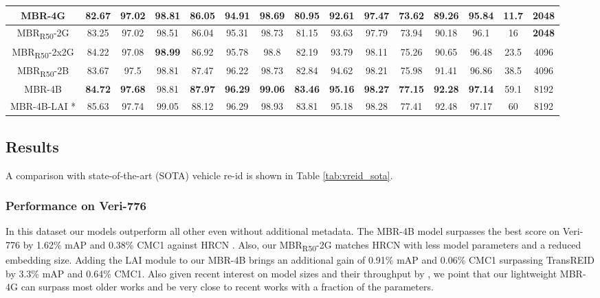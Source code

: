 \documentclass[letterpaper, 10pt, conference]{ieeeconf}
\begin{document}
\begin{table*}[tb]
\begin{center}
{\begin{tabular}{c||c|c|c||c|c|c|c|c|c|c|c|c||c|c}
MBR-4G & 82.67 & 97.02 & 98.81 & 86.05 & 94.91 & 98.69 &  80.95 & 92.61 & 97.47 & 73.62 & 89.26 & 95.84 & \textbf{11.7} & \textbf{2048} \\ \hline 
MBR\textsubscript{R50}-2G & 83.25 & 97.02 & 98.51 & 86.04 & 95.31 & 98.73 & 81.15 & 93.63 & 97.79 & 73.94 & 90.18 & 96.1 & 16 & \textbf{2048} \\ \hline 


 MBR\textsubscript{R50}-2x2G & 84.22 & 97.08 & \textbf{98.99} & 86.92 & 95.78 & 98.8 & 82.19 & 93.79 & 98.11 & 75.26 & 90.65 & 96.48 & 23.5 & 4096 \\ \hline
 MBR\textsubscript{R50}-2B  & 83.67 & 97.5 & 98.81 & 87.47 & 96.22 & 98.73 & 82.84 & 94.62 & 98.21 & 75.98 & 91.41 & 96.86 & 38.5 & 4096 \\ \hline 
MBR-4B & \textbf{84.72} & \textbf{97.68} & 98.81 & \textbf{87.97} & \textbf{96.29} & \textbf{99.06} & \textbf{83.46} & \textbf{95.16} & \textbf{98.27} & \textbf{77.15} & \textbf{92.28} & \textbf{97.14} & 59.1 & 8192 \\ \hline \hline

MBR-4B-LAI * & 85.63 & 97.74 & 99.05 & 88.12 & 96.29 & 98.93 & 83.81 & 95.18 & 98.28 & 77.41 & 92.48 & 97.17 & 60 & 8192 \\ \hline 


\end{tabular}}
\label{tab:vreid_sota}
\end{center}
\end{table*}




\subsection{Results}
A comparison with state-of-the-art (SOTA) vehicle re-id is shown in Table \ref{tab:vreid_sota}. 

\subsubsection{Performance on Veri-776}

In this dataset our models outperform all other even without additional metadata. The MBR-4B model surpasses the best score on Veri-776 by 1.62\% mAP and 0.38\% CMC1 against HRCN \cite{zhao2021heterogeneous}. Also, our MBR\textsubscript{R50}-2G matches HRCN with  less model parameters and a reduced embedding size. Adding the LAI module to our MBR-4B brings an additional gain of 0.91\% mAP and 0.06\% CMC1 surpassing TransREID \cite{he2021transreid} by 3.3\% mAP and 0.64\% CMC1.
Also given recent interest on model sizes and their throughput by \cite{khorramshahi2022scalable}, we point that our lightweight MBR-4G can surpass most older works and be very close to recent works with a fraction of the parameters.
\end{document}
